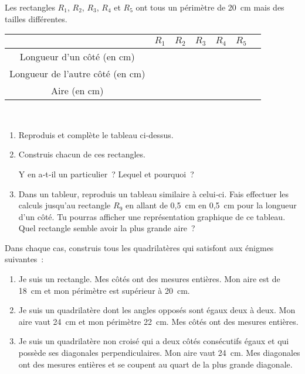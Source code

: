 \begin{exercice}
Les rectangles $R_1$, $R_2$, $R_3$, $R_4$ et $R_5$ ont tous un périmètre de 20 cm mais des tailles différentes.

\begin{center}
\begin{tabularx}{\linewidth}{|c|*{6}{>{\centering \arraybackslash}X|}}
\hline  & \cellcolor{A1} $R_1$ & \cellcolor{A1} $R_2$ & \cellcolor{A1} $R_3$ & \cellcolor{A1} $R_4$ & \cellcolor{A1} $R_5$ \\
\hline \cellcolor{H1} Longueur d'un côté (en cm) & 1 & 2 & 3 & 4 & 5 \\
\hline \cellcolor{H1} Longueur de l'autre côté (en cm) & & & & & \\
\hline \cellcolor{H1} Aire (en cm\up{2}) & & & & & \\
\hline
\end{tabularx} \\
\end{center}

\begin{enumerate}
 \item Reproduis et complète le tableau ci-dessus.
 \item Construis chacun de ces rectangles.
 
Y en a‑t‑il un particulier ? Lequel et pourquoi ?
 \item Dans un tableur, reproduis un tableau similaire à celui‑ci. Fais effectuer les calculs jusqu'au rectangle $R_9$ en allant de 0,5 cm en 0,5 cm pour la longueur d'un côté. Tu pourras afficher une représentation graphique de ce tableau. \\[0.5em]
Quel rectangle semble avoir la plus grande aire ?
 \end{enumerate}
\end{exercice}


\begin{exercice}
Dans chaque cas, construis tous les quadrilatères qui satisfont aux énigmes suivantes :
\begin{enumerate}
 \item Je suis un rectangle. Mes côtés ont des mesures entières. Mon aire est de 18 cm et mon périmètre est supérieur à 20 cm. 
 \item Je suis un quadrilatère dont les angles opposés sont égaux deux à deux. Mon aire vaut 24 cm et mon périmètre 22 cm. Mes côtés ont des mesures entières.
 \item Je suis un quadrilatère non croisé qui a deux côtés consécutifs égaux et qui possède ses diagonales perpendiculaires. Mon aire vaut 24 cm. Mes diagonales ont des mesures entières et se coupent au quart de la plus grande diagonale.
 \end{enumerate}
\end{exercice}


